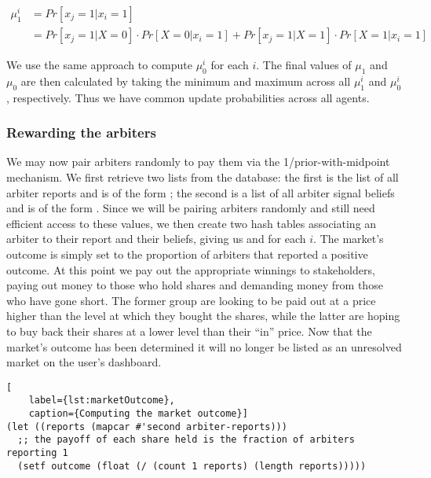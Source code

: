 \begin{equation}
	\label{eq:updateProbabilities}
	\begin{aligned}
		\mu_1^i & = Pr[x_j=1|x_i=1] \\
		& = Pr[x_j=1|X=0] \cdot Pr[X=0|x_i=1] + Pr[x_j=1|X=1] \cdot Pr[X=1|x_i=1]
	\end{aligned}
\end{equation}

We use the same approach to compute $\mu_0^i$ for each $i$. The final values of
$\mu_1$ and $\mu_0$ are then calculated by taking the minimum and maximum
across all $\mu_1^i$ and $\mu_0^i$, respectively. Thus we have common update
probabilities across all agents.

\subsubsection{Rewarding the arbiters}

We may now pair arbiters randomly to pay them via the 1/prior-with-midpoint
mechanism. We first retrieve two lists from the database: the first is the list
of all arbiter reports and is of the form ; the second is a list of all arbiter signal beliefs and is of the
form .
Since we will be pairing arbiters randomly and still need efficient access to
these values, we then create two hash tables associating an arbiter to their
report and their beliefs, giving us  and
 for each $i$. The
market's outcome is simply set to the proportion of arbiters that reported a
positive outcome. At this point we pay out the appropriate winnings to
stakeholders, paying out money to those who hold shares and demanding money
from those who have gone short. The former group are looking to be paid out at
a price higher than the level at which they bought the shares, while the latter
are hoping to buy back their shares at a lower level than their ``in'' price.
Now that the market's outcome has been determined it will no longer be listed
as an unresolved market on the user's dashboard.

\begin{lstlisting}[
	label={lst:marketOutcome},
	caption={Computing the market outcome}]
(let ((reports (mapcar #'second arbiter-reports)))
  ;; the payoff of each share held is the fraction of arbiters reporting 1
  (setf outcome (float (/ (count 1 reports) (length reports)))))
\end{lstlisting}

